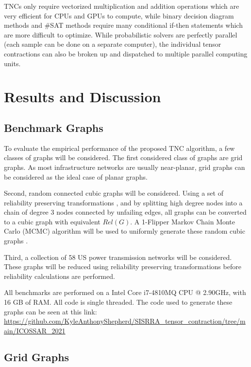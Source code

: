 TNCs only require vectorized multiplication and addition operations which are very efficient for CPUs and GPUs to compute, while binary decision diagram methods and \#SAT methods require many conditional if-then statements which are more difficult to optimize. While probabilistic solvers are perfectly parallel (each sample can be done on a separate computer), the individual tensor contractions can also be broken up and dispatched to multiple parallel computing units.

\hypertarget{results-and-discussion}{%
\section{Results and Discussion}\label{results-and-discussion}}

\hypertarget{benchmark-graphs}{%
\subsection{Benchmark Graphs}\label{benchmark-graphs}}

To evaluate the empirical performance of the proposed TNC algorithm, a few classes of graphs will be considered. The first considered class of graphs are grid graphs. As most infrastructure networks are usually near-planar, grid graphs can be considered as the ideal case of planar graphs.

Second, random connected cubic graphs will be considered. Using a set of reliability preserving transformations \cite{shooman1991exact}, and by splitting high degree nodes into a chain of degree 3 nodes connected by unfailing edges, all graphs can be converted to a cubic graph with equivalent \(Rel(G)\). A 1-Flipper Markov Chain Monte Carlo (MCMC) algorithm will be used to uniformly generate these random cubic graphs \cite{feder2006local}.

Third, a collection of 58 US power transmission networks \cite{li2016characterizing} will be considered. These graphs will be reduced using reliability preserving transformations before reliability calculations are performed.

All benchmarks are performed on a Intel Core i7-4810MQ CPU @ 2.90GHz, with 16 GB of RAM. All code is single threaded. The code used to generate these graphs can be seen at this link: \url{https://github.com/KyleAnthonyShepherd/SISRRA_tensor_contraction/tree/main/ICOSSAR_2021}

\hypertarget{grid-graphs}{%
\subsection{Grid Graphs}\label{grid-graphs}}

